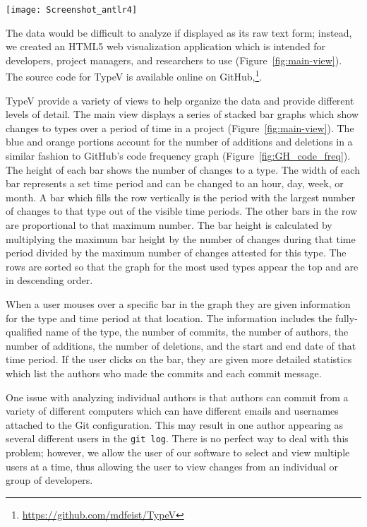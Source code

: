 \begin{figure*}[!t]
\centering
\texttt{[image: Screenshot\_antlr4]}
\caption{Screenshot showing the main view for TypeV. The data being displayed is from the antlr4 repository.}
\label{fig:main-view}
\end{figure*}

The data would be difficult to analyze if displayed as its raw text form; instead, we created an HTML5 web visualization application which is intended for developers, project managers, and researchers to use (Figure~\ref{fig:main-view}). The source code for TypeV is available online on GitHub,\footnote{\url{https://github.com/mdfeist/TypeV}}.

TypeV provide a variety of views to help organize the data and provide different levels of detail. The main view displays a series of stacked bar graphs which show changes to types over a period of time in a project (Figure~\ref{fig:main-view}). The blue and orange portions account for the number of additions and deletions in a similar fashion to GitHub’s code frequency graph (Figure~\ref{fig:GH_code_freq}). The height of each bar shows the number of changes to a type. The width of each bar represents a set time period and can be changed to an hour, day, week, or month. A bar which fills the row vertically is the period with the largest number of changes to that type out of the visible time periods. The other bars in the row are proportional to that maximum number.  The bar height is calculated by multiplying the maximum bar height by the number of changes during that time period divided by the maximum number of changes attested for this type. The rows are sorted so that the graph for the most used types appear the top and are in descending order.

When a user mouses over a specific bar in the graph they are given information for the type and time period at that location. The information includes the fully-qualified name of the type, the number of commits, the number of authors, the number of additions, the number of deletions, and the start and end date of that time period. If the user clicks on the bar, they are given more detailed statistics which list the authors who made the commits and each commit message.

One issue with analyzing individual authors is that authors can commit from a variety of different computers which can have different emails and usernames attached to the Git configuration. This may result in one author appearing as several different users in the \texttt{git log}. There is no perfect way to deal with this problem; however, we allow the user of our software to select and view multiple users at a time, thus allowing the user to view changes from an individual or group of developers.


